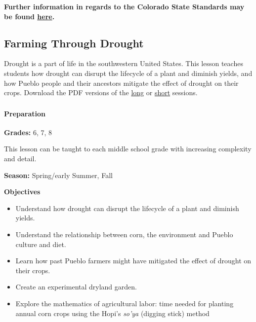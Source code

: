 \documentclass[12pt,]{article}
\providecommand{\tightlist}{%
  \setlength{\itemsep}{0pt}\setlength{\parskip}{0pt}}
\let\oldparagraph\paragraph
\renewcommand{\paragraph}[1]{\oldparagraph{#1}\mbox{}}
\begin{document}
\textbf{Further information in regards to the Colorado State Standards may be found \href{http://www2.cde.state.co.us/scripts/allstandards/COStandards.asp}{here}.}

\hypertarget{farming-through-drought}{%
\subsection{Farming Through Drought}\label{farming-through-drought}}

Drought is a part of life in the southwestern United States. This lesson teaches students how drought can disrupt the lifecycle of a plant and diminish yields, and how Pueblo people and their ancestors mitigate the effect of drought on their crops. Download the PDF versions of the \href{./lessons/PFP_Lesson-2_Farming-Through-Drought_Long.pdf}{long} or \href{./lessons/PFP_Lesson-2_Farming-Through-Drought_Short.pdf}{short} sessions.

\hypertarget{section-1}{%
\subsubsection*{}\label{section-1}}

\hypertarget{preparation-1}{%
\paragraph{Preparation}\label{preparation-1}}

\textbf{Grades:} 6, 7, 8

This lesson can be taught to each middle school grade with increasing
complexity and detail.

\textbf{Season:} Spring/early Summer, Fall

\textbf{Objectives}

\begin{itemize}
\tightlist
\item
  Understand how drought can disrupt the lifecycle of a plant and diminish yields.
\item
  Understand the relationship between corn, the environment and Pueblo culture and diet.
\item
  Learn how past Pueblo farmers might have mitigated the effect of drought on their
  crops.
\item
  Create an experimental dryland garden.
\item
  Explore the mathematics of agricultural labor: time needed for planting annual corn
  crops using the Hopi's \emph{so'ya} (digging stick) method
\end{itemize}
\end{document}
